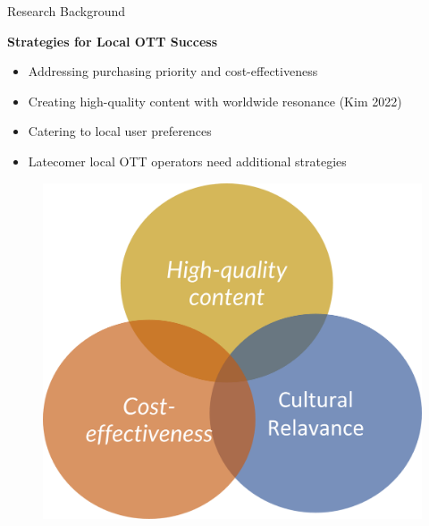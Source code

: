 \documentclass[
  ignorenonframetext,
]{beamer}
\begin{document}
\begin{frame}{Research Background}
\protect\hypertarget{research-background-2}{}
\begin{block}{\textbf{Strategies for Local OTT Success}}
\protect\hypertarget{strategies-for-local-ott-success}{}
\begin{itemize}
\item
  Addressing purchasing priority and cost-effectiveness
\item
  Creating high-quality content with worldwide resonance (Kim 2022)
\item
  Catering to local user preferences
\item
  Latecomer local OTT operators need additional strategies
\end{itemize}

\begin{figure}

{\centering \includegraphics{img/fig_3.png}

}

\end{figure}
\end{block}
\end{frame}
\end{document}
